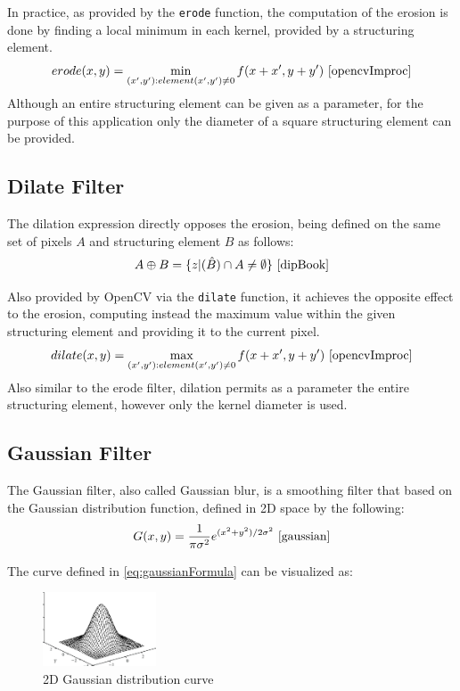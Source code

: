 In practice, as provided by the \verb|erode| function, the computation of the erosion is done by finding a
local minimum in each kernel, provided by a structuring element.
\[erode(x, y) = \min\limits_{(x', y'): element(x', y') \neq 0} f(x + x', y + y')\text{ \cite{opencvImproc}}\]
Although an entire structuring element can be given as a parameter, for the purpose of this application only
the diameter of a square structuring element can be provided.

\subsection{Dilate Filter}

The dilation expression directly opposes the erosion, being defined on the same set of pixels \(A\) and
structuring element \(B\) as follows:
\[A \oplus B = \{z | (\hat{B}) \cap A \neq \emptyset\}\text{ \cite{dipBook}}\]

Also provided by OpenCV via the \verb|dilate| function, it achieves the opposite effect to the erosion,
computing instead the maximum value within the given structuring element and providing it to the current
pixel.
\[dilate(x, y) = \max\limits_{(x', y'): element(x', y') \neq 0} f(x + x', y + y')\text{ \cite{opencvImproc}}\]
Also similar to the erode filter, dilation permits as a parameter the entire structuring element, however
only the kernel diameter is used.

\subsection{Gaussian Filter}

The Gaussian filter, also called Gaussian blur, is a smoothing filter that based on the
Gaussian distribution function, defined in 2D space by the following:
\begin{equation}
	\label{eq:gaussianFormula}
	G(x, y) = {1\over\pi \sigma^2}{e^{(x^2 + y^2) / 2\sigma^2}}
	\text{ \cite{gaussian}}
\end{equation}

The curve defined in \cref{eq:gaussianFormula} can be visualized as:
\begin{figure}[H]
	\includegraphics[width=0.30\textwidth, height=0.30\textwidth]{resources/Gaussian_Distribution.png}
	\caption{2D Gaussian distribution curve \cite{gaussian}}
\end{figure}

